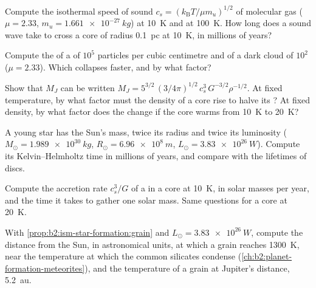 \begin{exercise}[$\star$]\label{exo:b2:ism-star-formation:3}
Compute the isothermal speed of sound $c_s = (k_{\mathrm B}T/\mu m_u)^{1/2}$ of
molecular gas ($\mu = 2.33$, $m_u = \qty{1.661e-27}{kg}$) at \qty{10}{K} and at
\qty{100}{K}. How long does a sound wave take to cross a core of radius
\qty{0.1}{pc} at \qty{10}{K}, in millions of years?
\end{exercise}

\begin{exercise}[$\star$]\label{exo:b2:ism-star-formation:4}
Compute the  of a  of $10^5$ particles per cubic
centimetre and of a dark cloud of $10^2$ ($\mu = 2.33$). Which collapses
faster, and by what factor?
\end{exercise}

\begin{exercise}[$\star\star$]\label{exo:b2:ism-star-formation:5}
Show that $M_J$ can be written $M_J = 5^{3/2}\,(3/4\pi)^{1/2}\,c_s^3\,G^{-3/2}\rho^{-1/2}$.
At fixed temperature, by what factor must the density of a core rise to halve
its ? At fixed density, by what factor does the  change if
the core warms from \qty{10}{K} to \qty{20}{K}?
\end{exercise}

\begin{exercise}[$\star\star$]\label{exo:b2:ism-star-formation:6}
A young star has the Sun's mass, twice its radius and twice its luminosity
($M_\odot = \qty{1.989e30}{kg}$, $R_\odot = \qty{6.96e8}{m}$,
$L_\odot = \qty{3.83e26}{W}$). Compute its Kelvin--Helmholtz time in millions of
years, and compare with the lifetimes of discs.
\end{exercise}

\begin{exercise}[$\star\star$]\label{exo:b2:ism-star-formation:7}
Compute the accretion rate $c_s^3/G$ of a  in a core at \qty{10}{K}, in
solar masses per year, and the time it takes to gather one solar mass. Same
questions for a core at \qty{20}{K}.
\end{exercise}

\begin{exercise}[$\star\star$]\label{exo:b2:ism-star-formation:8}
With \cref{prop:b2:ism-star-formation:grain} and $L_\odot = \qty{3.83e26}{W}$,
compute the distance from the Sun, in astronomical units, at which a grain
reaches \qty{1300}{K}, near the temperature at which the common silicates
condense (\cref{ch:b2:planet-formation-meteorites}), and
the temperature of a grain at Jupiter's distance, \qty{5.2}{au}.
\end{exercise}

